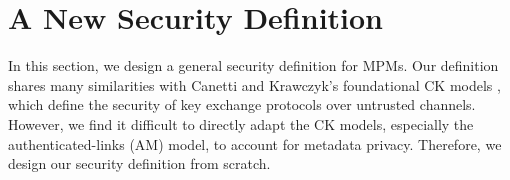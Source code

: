 \section{A New Security Definition}
\label{sec:general-defn}
In this section, we design a general security definition for MPMs. Our definition shares many similarities with Canetti and Krawczyk's foundational CK models \cite{CK2001keyexchange}, which define the security of key exchange protocols over untrusted channels. However, we find it difficult to directly adapt the CK models, especially the authenticated-links (AM) model, to account for metadata privacy. Therefore, we design our security definition from scratch.

